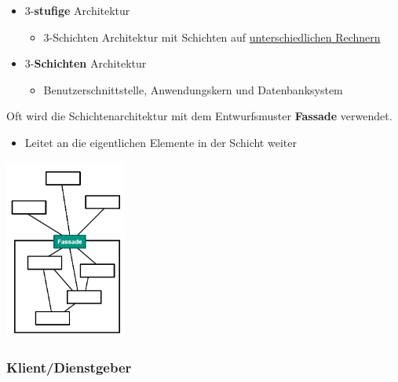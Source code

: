 			\begin{itemize}	
				\item 3-\textbf{stufige} Architektur
				\begin{itemize}
					\item 3-Schichten Architektur mit Schichten auf \underline{unterschiedlichen Rechnern}
				\end{itemize}
				\item 3-\textbf{Schichten} Architektur
				\begin{itemize}
					\item Benutzerschnittstelle, Anwendungskern und Datenbanksystem
				\end{itemize}
			\end{itemize}		
			Oft wird die Schichtenarchitektur mit dem Entwurfsmuster \textbf{Fassade} verwendet.
			\begin{itemize}
				\item Leitet an die eigentlichen Elemente in der Schicht weiter
			\end{itemize}				
			\begin{center}
				\includegraphics[width=0.3\textwidth]{../resources/images/fassadeSchichtenarchitektur.png}
			\end{center}
						
		\subsubsection{Klient/Dienstgeber}
						
